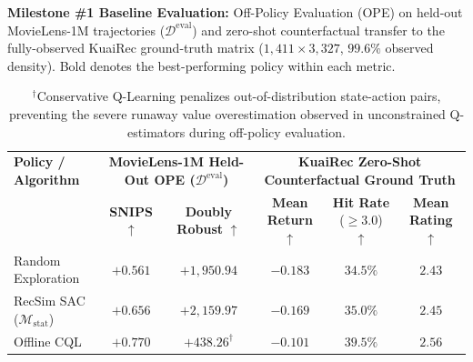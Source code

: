 \begin{table}[t]
\centering
\caption{\textbf{Milestone \#1 Baseline Evaluation:} Off-Policy Evaluation (OPE) on held-out MovieLens-1M trajectories ($\mathcal{D}^{\mathrm{eval}}$) and zero-shot counterfactual transfer to the fully-observed KuaiRec ground-truth matrix ($1{,}411 \times 3{,}327$, $99.6\%$ observed density). Bold denotes the best-performing policy within each metric.}
\label{tab:milestone1_baselines}
\small
\renewcommand{\arraystretch}{1.18}
\begin{tabular}{@{}lccccc@{}}
\toprule
\textbf{Policy / Algorithm} & \multicolumn{2}{c}{\textbf{MovieLens-1M Held-Out OPE ($\mathcal{D}^{\mathrm{eval}}$)}} & \multicolumn{3}{c}{\textbf{KuaiRec Zero-Shot Counterfactual Ground Truth}} \\
\cmidrule(lr){2-3} \cmidrule(lr){4-6}
& \textbf{SNIPS} $\uparrow$ & \textbf{Doubly Robust} $\uparrow$ & \textbf{Mean Return} $\uparrow$ & \textbf{Hit Rate} ($\ge 3.0$) $\uparrow$ & \textbf{Mean Rating} $\uparrow$ \\
\midrule
Random Exploration & $+0.561$ & $+1{,}950.94$ & $-0.183$ & $34.5\%$ & $2.43$ \\
RecSim SAC ($\mathcal{M}_{\mathrm{stat}}$) & $+0.656$ & $+2{,}159.97$ & $-0.169$ & $35.0\%$ & $2.45$ \\
Offline CQL & $\mathbf{+0.770}$ & $\mathbf{+438.26}^\dagger$ & $\mathbf{-0.101}$ & $\mathbf{39.5\%}$ & $\mathbf{2.56}$ \\
\bottomrule
\end{tabular}
\vspace{3pt}
\caption*{\footnotesize $^\dagger$Conservative Q-Learning penalizes out-of-distribution state-action pairs, preventing the severe runaway value overestimation observed in unconstrained Q-estimators during off-policy evaluation.}
\end{table}
